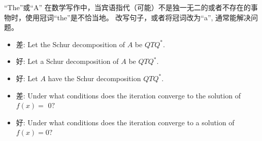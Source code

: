 \documentclass[fontset=mac]{ctexbeamer}
\begin{document}
\begin{frame}{``The''或``A''}
在数学写作中，当宾语指代（可能）不是独一无二的或者不存在的事物时，使用冠词``the''是不恰当地。
改写句子，或者将冠词改为``a'', 通常能解决问题。
\vspace{10pt}

{
\begin{itemize}
\item 差: Let the Schur decomposition of $A$ be $Q T Q^{*}$. \pause
\item 好: Let a Schur decomposition of $A$ be $Q T Q^{*}$.
\item 好: Let $A$ have the Schur decomposition $Q T Q^{*}$.
	\end{itemize}
}

\vspace{10pt}

\begin{itemize}
\item 差: Under what conditions does the iteration converge to the solution of $f(x)=$ 
$0 ?$  \pause
\item  好: Under what conditions does the iteration converge to a solution of $f(x)=0 ?$
\end{itemize}
\end{frame}
\end{document}
